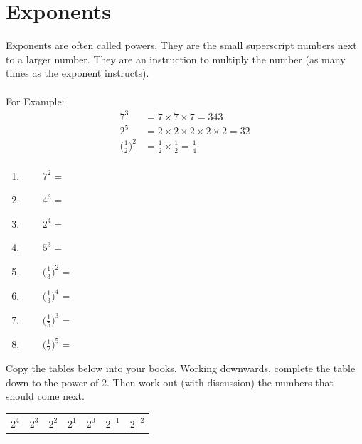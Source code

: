 \documentclass[a4paper,12pt]{article}
\begin{document}
\section{Exponents}
Exponents are often called powers. They are the small superscript numbers next to a larger number.
They are an instruction to multiply the number (as many times as the exponent instructs).\\\\
For Example:
\begin{align*}
7^{3}&=7\times7\times7=343\\
2^{5}&=2\times2\times2\times2\times2=32\\
\Big(\frac{1}{2}\Big)^{2}&=\frac{1}{2}\times\frac{1}{2}=\frac{1}{4}\\
\end{align*}
\begin{tcolorbox}[colback=red!0!white, colframe=gray ,title=\subsubsection{Work out the following (without a calculator).}\label{exp0}]
\begin{multicols}{3}
	\begin{enumerate}
		\item ~~~~$7^{2}=$
		\item ~~~~$4^{3}=$
		\item ~~~~$2^{4}=$
		\item ~~~~$5^{3}=$
		\item ~~~~$\displaystyle \Big(\frac{1}{3}\Big)^{2}=$
		\item ~~~~$\displaystyle \Big(\frac{1}{3}\Big)^{4}=$
		\item ~~~~$\displaystyle \Big(\frac{1}{5}\Big)^{3}=$
		\item ~~~~$\displaystyle \Big(\frac{1}{2}\Big)^{5}=$
	\end{enumerate}
\end{multicols}
\end{tcolorbox}\vspace{0.75cm}
Copy the tables below into your books.
Working downwards, complete the table down to the power of 2.
Then work out (with discussion) the numbers that should come next.\\

\newlength{\len}
\setlength{\len}{2cm}
\begin{center}
	\begin{tabular}{| >{\centering\arraybackslash}m{\len} | >{\centering\arraybackslash}m{\len}  | >{\centering\arraybackslash}m{\len} | >{\centering\arraybackslash}m{\len} |>{\centering\arraybackslash}m{\len} |>{\centering\arraybackslash}m{\len} |>{\centering\arraybackslash}m{\len} |}\hline
		$2^{4}$ & $2^{3}$ & $2^{2}$&$2^{1}$& $2^{0}$ & $2^{-1}$&$2^{-2}$\\\hline
		&&&&&&\\\hline\end{tabular}
\end{center}
\end{document}
